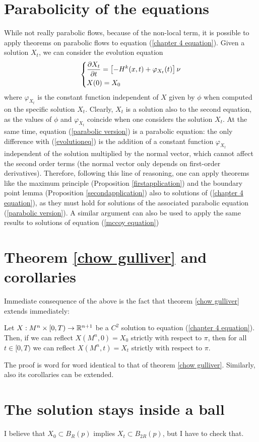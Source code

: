 \section{Parabolicity of the equations}
While not really parabolic flows, because of the non-local term, it is possible to apply theorems on parabolic flows to equation (\ref{chapter 4 equation}). Given a solution $X_t$, we can consider the evolution equation 
\begin{align}
	\begin{dcases}
		\frac{\partial X_t}{\partial t} = \left[- H^k(x, t) + \varphi_{X_t}(t)\right] \nu\\
		X(0)= X_0
	\end{dcases} \label{parabolic version}
\end{align}
where $\varphi_{X_t}$ is the constant function independent of $X$ given by $\phi$ when computed on the specific solution $X_t$. 
Clearly, $X_t$ is a solution also to the second equation, as the values of  $\phi$ and $\varphi_{X_t}$ coincide when one considers the solution $X_t$. At the same time, equation (\ref{parabolic version}) is a parabolic equation: the only difference with (\ref{evolutioneq}) is the addition of a constant function $\varphi_{X_t}$ independent of the solution multiplied by the normal vector, which cannot affect the second order terms (the normal vector only depends on first-order derivatives). Therefore, following this line of reasoning, one can apply theorems like the maximum principle (Proposition \ref{firstapplication}) and the boundary point lemma (Proposition \ref{secondapplication}) also to solutions of (\ref{chapter 4 equation}), as they must hold for solutions of the associated parabolic equation (\ref{parabolic version}). A similar argument can also be used to apply the same results to solutions of equation (\ref{mccoy equation})

\section{Theorem \ref{chow gulliver} and corollaries}

Immediate consequence of the above is the fact that theorem \ref{chow gulliver} extends immediately:

\begin{theorem}
	Let $X:M^n\times [0,T) \rightarrow \mathbb{R}^{n+1}$ be a $C^2$ solution to equation (\ref{chapter 4 equation}). Then, if we can reflect $X(M^n, 0)=X_0$ strictly with respect to $\pi$, then for all $t\in [0,T)$ we can reflect $X(M^n, t)=X_t$ strictly with respect to $\pi$. 
\end{theorem}

The proof is word for word identical to that of theorem \ref{chow gulliver}. 
Similarly, also its corollaries can be extended. 
\section{The solution stays inside a ball}

I believe that $X_0\subset B_R(p)$ implies  $X_t\subset B_{2R}(p)$, but I have to check that.

